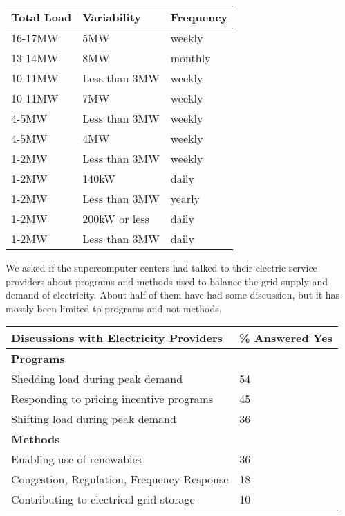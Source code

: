 \documentclass{llncs}
\begin{document}
\begin{table}[htbp]

\begin{center}
\begin{tabular}{|p{65pt}|l|l|}
\hline
\textbf{Total Load}&
\textbf{Variability}&
\textbf{Frequency} \\
\hline
16-17MW&
5MW&
weekly \\
\hline
13-14MW&
8MW&
monthly \\
\hline
10-11MW&
Less than 3MW&
weekly \\
\hline
10-11MW&
7MW&
weekly \\
\hline
4-5MW&
Less than 3MW&
weekly \\
\hline
4-5MW&
4MW&
weekly \\
\hline
1-2MW&
Less than 3MW&
weekly \\
\hline
1-2MW&
140kW&
daily \\
\hline
1-2MW&
Less than 3MW&
yearly \\
\hline
1-2MW&
200kW or less&
daily \\
\hline
1-2MW&
Less than 3MW&
daily \\
\hline
\end{tabular}
\label{tab1}
\end{center}
\end{table}

We asked if the supercomputer centers had talked to their electric service
providers about programs and methods used to balance the grid supply and
demand of electricity. About half of them have had some discussion, but it
has mostly been limited to programs and not methods.

\begin{table}[htbp]

\begin{center}
\begin{tabular}{|p{230pt}|l|}
\hline
\textbf{Discussions with Electricity Providers}&
{\%} Answered Yes \\
\hline
\textbf{Programs}&
~ \\
\hline
Shedding load during peak demand&
54 \\
\hline
Responding to pricing incentive programs&
45 \\
\hline
Shifting load during peak demand&
36 \\
\hline
\textbf{Methods}&
~ \\
\hline
Enabling use of renewables&
36 \\
\hline
Congestion, Regulation, Frequency Response&
18 \\
\hline
Contributing to electrical grid storage&
10 \\
\hline
\end{tabular}
\label{tab1}
\end{center}
\end{table}
\end{document}
